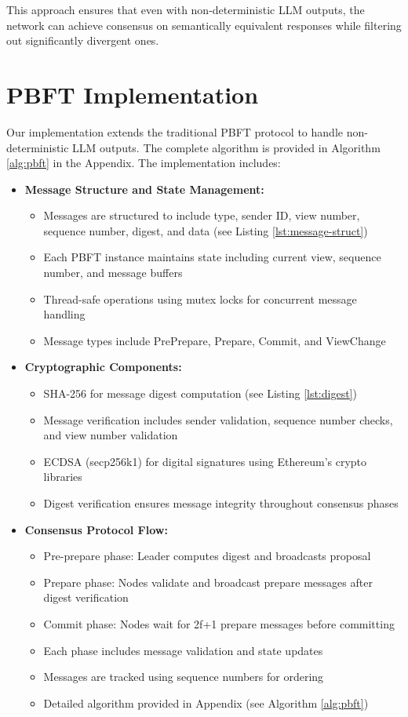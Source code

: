 \documentclass[12pt]{article}
\begin{document}
This approach ensures that even with non-deterministic LLM outputs, the network can achieve consensus on semantically equivalent responses while filtering out significantly divergent ones.

\section{PBFT Implementation}
Our implementation extends the traditional PBFT protocol to handle non-deterministic LLM outputs. The complete algorithm is provided in Algorithm \ref{alg:pbft} in the Appendix. The implementation includes:

\begin{itemize}
    \item \textbf{Message Structure and State Management:}
    \begin{itemize}
        \item Messages are structured to include type, sender ID, view number, sequence number, digest, and data (see Listing \ref{lst:message-struct})
        \item Each PBFT instance maintains state including current view, sequence number, and message buffers
        \item Thread-safe operations using mutex locks for concurrent message handling
        \item Message types include PrePrepare, Prepare, Commit, and ViewChange
    \end{itemize}

    \item \textbf{Cryptographic Components:}
    \begin{itemize}
        \item SHA-256 for message digest computation (see Listing \ref{lst:digest})
        \item Message verification includes sender validation, sequence number checks, and view number validation
        \item ECDSA (secp256k1) for digital signatures using Ethereum's crypto libraries
        \item Digest verification ensures message integrity throughout consensus phases
    \end{itemize}

    \item \textbf{Consensus Protocol Flow:}
    \begin{itemize}
        \item Pre-prepare phase: Leader computes digest and broadcasts proposal
        \item Prepare phase: Nodes validate and broadcast prepare messages after digest verification
        \item Commit phase: Nodes wait for 2f+1 prepare messages before committing
        \item Each phase includes message validation and state updates
        \item Messages are tracked using sequence numbers for ordering
        \item Detailed algorithm provided in Appendix (see Algorithm \ref{alg:pbft})
    \end{itemize}


\end{itemize}
\end{document}
